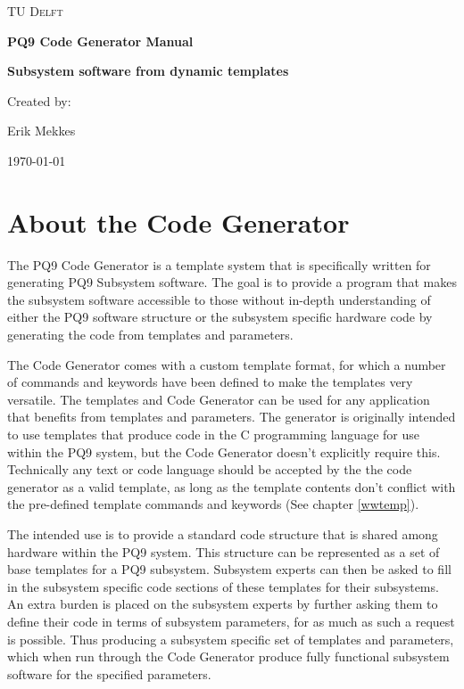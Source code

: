 \documentclass{settings/TU_Delft_Report}
\begin{document}
\begin{titlepage}
	\centering
	{\scshape\LARGE TU Delft \par}
	\vspace{1cm}
	{\huge\bfseries PQ9 Code Generator Manual\par}
	{\Large\bfseries Subsystem software from dynamic templates \par}

	\vfill  %
	{Created by: \par
	    Erik Mekkes}
	
	\vspace{0.3cm}
	
	{\large \today\par} %
\end{titlepage}

\tableofcontents


\chapter{About the Code Generator}
The PQ9 Code Generator is a template system that is specifically written for generating PQ9 Subsystem software. The goal is to provide a program that makes the subsystem software accessible to those without in-depth understanding of either the PQ9 software structure or the subsystem specific hardware code by generating the code from templates and parameters. 

\vsp The Code Generator comes with a custom template format, for which a number of commands and keywords have been defined to make the templates very versatile. The templates and Code Generator can be used for any application that benefits from templates and parameters. The generator is originally intended to use templates that produce code in the C programming language for use within the PQ9 system, but the Code Generator doesn't explicitly require this. Technically any text or code language should be accepted by the the code generator as a valid template, as long as the template contents don't conflict with the pre-defined template commands and keywords (See chapter \ref{wwtemp}).

\vsp The intended use is to provide a standard code structure that is shared among hardware within the PQ9 system. This structure can be represented as a set of base templates for a PQ9 subsystem. Subsystem experts can then be asked to fill in the subsystem specific code sections of these templates for their subsystems. An extra burden is placed on the subsystem experts by further asking them to define their code in terms of subsystem parameters, for as much as such a request is possible. Thus producing a subsystem specific set of templates and parameters, which when run through the Code Generator produce fully functional subsystem software for the specified parameters.
\end{document}
